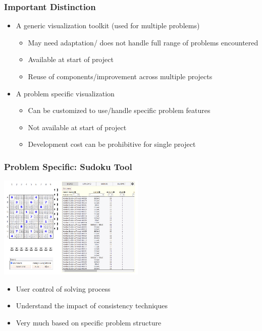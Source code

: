 \begin{frame}
\frametitle{Important Distinction}
\begin{itemize}
\item A generic visualization toolkit (used for multiple problems)
\begin{itemize}
\item May need adaptation/ does not handle full range of problems encountered
\item Available at start of project
\item Reuse of components/improvement across multiple projects
\end{itemize}
\item A problem specific visualization
\begin{itemize}
\item Can be customized to use/handle specific problem features
\item Not available at start of project
\item Development cost can be prohibitive for single project
\end{itemize}

\end{itemize}
\end{frame}

\begin{frame}
\frametitle{Problem Specific: Sudoku Tool \cite{DBLP:conf/ijcai/HowellWCB18}}
\includegraphics[width=7cm]{images/sudokuweb}
\begin{itemize}
\item User control of solving process
\item Understand the impact of consistency techniques
\item Very much based on specific problem structure
\end{itemize}
\end{frame}

